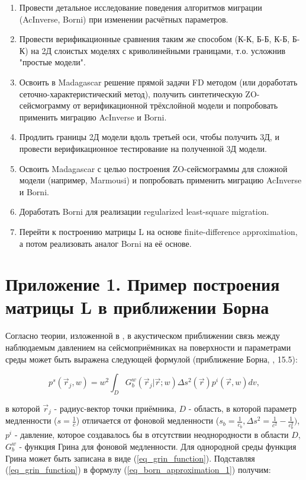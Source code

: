 \documentclass{article}
\begin{document}
\begin{enumerate}
\item Провести детальное исследование поведения алгоритмов миграции (AcInverse, Borni) при изменении расчётных параметров.
\item Провести верификационные сравнения таким же способом (К-К, Б-Б, К-Б, Б-К) на 2Д слоистых моделях с криволинейными границами, т.о. усложнив "простые модели".
\item Освоить в Madagascar решение прямой задачи FD методом (или доработать сеточно-характеристический метод), получить синтетическую ZO-сейсмограмму от верификационной трёхслойной модели и попробовать применить миграцию AcInverse и Borni.
\item Продлить границы 2Д модели вдоль третьей оси, чтобы получить 3Д, и провести верификационное тестирование на полученной 3Д модели.
\item Освоить Madagascar с целью построения ZO-сейсмограммы для сложной модели (например, Marmousi) и попробовать применить миграцию AcInverse и Borni.
\item Доработать Borni для реализации regularized least-square migration.
\item Перейти к построению матрицы L на основе finite-difference approximation, а потом реализовать аналог Borni на её основе.
\end{enumerate}

\section{Приложение 1. Пример построения матрицы L в приближении Борна}

Согласно теории, изложенной в \cite{Zhdanov_2007}, в акустическом приближении связь между наблюдаемым давлением на
сейсмоприёмниках на поверхности и параметрами среды может быть выражена следующей формулой (приближение Борна, \cite{Zhdanov_2007}, 15.5):

\begin{equation}
\label{eq_born_approximation_1}
p^s(\vec{r}_j, w) = w^2\int_D G^w_b(\vec{r}_j|\vec{r};w)\Delta s^2(\vec{r})p^i(\vec{r},w)  dv,
\end{equation}

в которой $\vec{r}_j$ - радиус-вектор точки приёмника, $D$ - область, в которой параметр медленности ($s = \frac{1}{c}$)
отличается от фоновой медленности ($s_b = \frac{1}{c_b},\Delta s^2 = \frac{1}{c^2} - \frac{1}{c^2_b})$, $p^i$ - давление, которое создавалось бы
в отсутствии неоднородности в области $D$, $G^w_b$ - функция Грина для фоновой медленности.
Для однородной среды функция Грина может быть записана в виде (\ref{eq_grin_function}).
Подставляя (\ref{eq_grin_function}) в формулу (\ref{eq_born_approximation_1}) получим:
\end{document}
